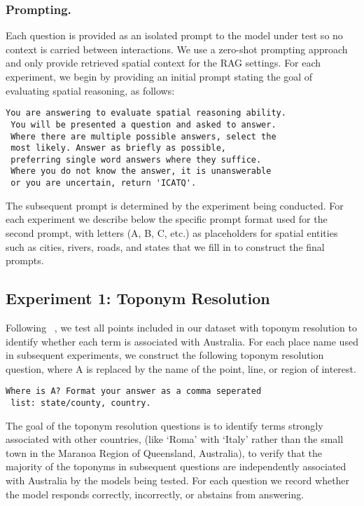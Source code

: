 \subsubsection{Prompting.} 
Each question is provided as an isolated prompt to the model under test so no context is carried between interactions.
We use a zero-shot prompting approach and only provide retrieved spatial context for the RAG settings.
For each experiment, we begin by providing an initial prompt stating the goal of evaluating spatial reasoning, as follows:

\begin{lstlisting}[title=Prompt 1: Initial System Prompt]
 You are answering to evaluate spatial reasoning ability. 
 You will be presented a question and asked to answer. 
 Where there are multiple possible answers, select the 
 most likely. Answer as briefly as possible, 
 preferring single word answers where they suffice. 
 Where you do not know the answer, it is unanswerable 
 or you are uncertain, return 'ICATQ'.
\end{lstlisting}

\noindent The subsequent prompt is determined by the experiment being conducted.
For each experiment we describe below the specific prompt format used for the second prompt, with letters (A, B, C, etc.) as placeholders for spatial entities such as cities, rivers, roads, and states that we fill in to construct the final prompts.


\subsection{Experiment 1: Toponym Resolution}

Following \citeauthor{Osullivan2024}~\cite{Osullivan2024}, we test all points included in our dataset with toponym resolution to identify whether each term is associated with Australia.
For each place name used in subsequent experiments, we construct the following toponym resolution question, where A is replaced by the name of the point, line, or region of interest.

\begin{lstlisting}[title=Prompt 2: Toponym Resolution Prompt]
 Where is A? Format your answer as a comma seperated 
 list: state/county, country.
\end{lstlisting}

\noindent The goal of the toponym resolution questions is to identify terms strongly associated with other countries, (like `Roma' with `Italy' rather than the small town in the Maranoa Region of Queensland, Australia), to verify that the majority of the toponyms in subsequent questions are independently associated with Australia by the models being tested.
For each question we record whether the model responds correctly, incorrectly, or abstains from answering.



